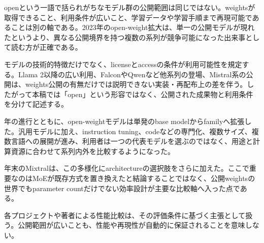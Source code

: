 
openという一語で括られがちなモデル群の公開範囲は同じではない。weightsが取得できること、利用条件が広いこと、学習データや学習手順まで再現可能であることは別の軸である。2023年のopen-weight拡大は、単一の公開モデルが現れたというより、異なる公開境界を持つ複数の系列が競争可能になった出来事として読む方が正確である。\autocite{src-00c370ab2324,src-1fd43f93adcc,src-240ca564b6b8,src-3db09fede330,src-5c8e2db8871a,src-74aa7e2a7ca4,src-81f670ec1e74,src-8bdb904686fb,src-9df482e2c96c,src-b7e5243e6d59,src-bc7aba201f01,src-d4b6359bbad1,src-dd2cfa98160d,src-f0349196879e}


モデルの技術的特徴だけでなく、licenseとaccessの条件が利用可能性を規定する。Llama 2以降の広い利用、FalconやQwenなど他系列の登場、Mistral系の公開は、weights公開の有無だけでは説明できない実装・再配布上の差を伴う。したがって本稿では「open」という形容ではなく、公開された成果物と利用条件を分けて記述する。\autocite{src-00c370ab2324,src-1fd43f93adcc,src-240ca564b6b8,src-3db09fede330,src-5c8e2db8871a,src-74aa7e2a7ca4,src-81f670ec1e74,src-8bdb904686fb,src-9df482e2c96c,src-b7e5243e6d59,src-bc7aba201f01,src-d4b6359bbad1,src-dd2cfa98160d,src-f0349196879e}


年の進行とともに、open-weightモデルは単発のbase modelからfamilyへ拡張した。汎用モデルに加え、instruction tuning、codeなどの専門化、複数サイズ、複数言語への展開が進み、利用者は一つの代表モデルを選ぶのではなく、用途と計算資源に合わせて系列内外を比較するようになった。\autocite{src-00c370ab2324,src-240ca564b6b8,src-3db09fede330,src-5c8e2db8871a,src-8bdb904686fb,src-9df482e2c96c,src-b7e5243e6d59,src-bc7aba201f01,src-d4b6359bbad1,src-dd2cfa98160d,src-f0349196879e}


年末のMixtralは、この多様化にarchitectureの選択肢をさらに加えた。ここで重要なのはMoEが既存方式を置き換えたと結論することではなく、公開weightsの世界でもparameter countだけでない効率設計が主要な比較軸へ入った点である。\autocite{src-00c370ab2324,src-dd2cfa98160d,src-f0349196879e}


\begin{claimboundary}
各プロジェクトや著者による性能比較は、その評価条件に基づく主張として扱う。公開範囲が広いことも、性能や再現性が自動的に保証されることを意味しない。\autocite{src-240ca564b6b8,src-3db09fede330,src-8bdb904686fb,src-9df482e2c96c,src-b7e5243e6d59,src-bc7aba201f01}
\end{claimboundary}
